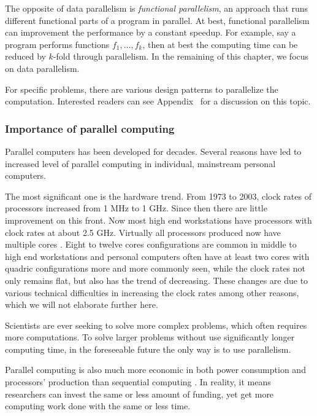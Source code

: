 The opposite of data parallelism is \emph{functional parallelism}, an approach
that runs different functional parts of a program in parallel. At best,
functional parallelism can improvement the performance by a constant speedup.
For example, say a program performs functions $f_1,\dots,f_k$, then at best
the computing time can be reduced by $k$-fold through parallelism. In the
remaining of this chapter, we focus on data parallelism.

For specific problems, there are various design patterns to parallelize the
computation. Interested readers can see Appendix~ for a discussion on this topic.

\subsubsection{Importance of parallel computing}
\label{ssub:Importance of parallel computing}

Parallel computers has been developed for decades. Several reasons have led to
increased level of parallel computing in individual, mainstream personal
computers.

The most significant one is the hardware trend. From 1973 to 2003, clock rates
of processors increased from 1 MHz to 1 GHz. Since then there are little
improvement on this front. Now most high end workstations have processors with
clock rates at about 2.5 GHz. Virtually all processors produced now have
multiple cores \cite{parallel}. Eight to twelve cores configurations are
common in middle to high end workstations and personal computers often have at
least two cores with quadric configurations more and more commonly seen, while
the clock rates not only remains flat, but also has the trend of decreasing.
These changes are due to various technical difficulties in increasing the
clock rates among other reasons, which we will not elaborate further here.

Scientists are ever seeking to solve more complex problems, which often
requires more computations. To solve larger problems without use significantly
longer computing time, in the foreseeable future the only way is to use
parallelism.

Parallel computing is also much more economic in both power consumption and
processors' production than sequential computing \cite{parallel}. In reality,
it means researchers can invest the same or less amount of funding, yet get
more computing work done with the same or less time.

